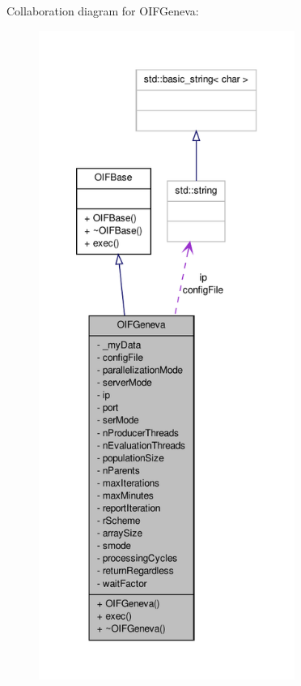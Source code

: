 Collaboration diagram for OIFGeneva:\nopagebreak
\begin{figure}[H]
\begin{center}
\leavevmode
\includegraphics[height=600pt]{df/d29/classOIFGeneva__coll__graph}
\end{center}
\end{figure}
